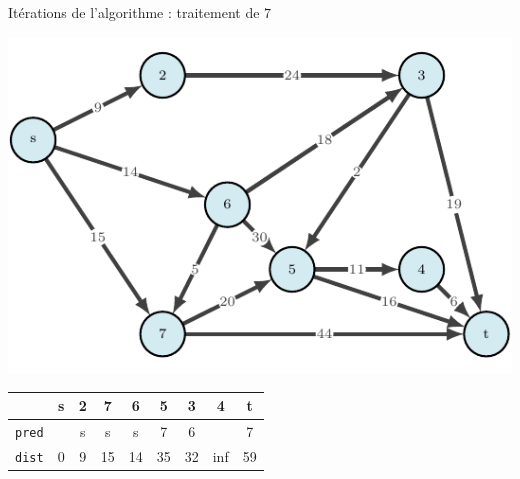 \begin{frame}{Itérations de l'algorithme : traitement de $7$}
    \begin{center}
        \includegraphics[height=.6\textheight]{fig/dijkstra-0.pdf}      
    \begin{tabular}{c|cccccccc}
      
        & \textbf{s}   &\textbf{2}     &\textbf{7}     &\textbf{6}     &5      &3      &4      &t      \\
        \hline
        \texttt{pred} & &s      &s      &s      &7      &6      &       &7      \\
        \texttt{dist} & 0       &9      &15     &14     &35     &32     &inf    &59     \\
    \end{tabular}
\end{center}
\end{frame}

